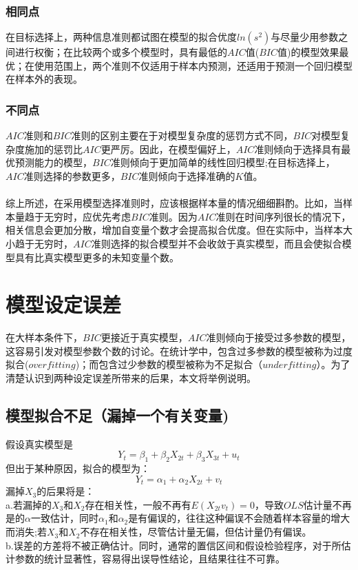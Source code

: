 \documentclass[12pt,a4paper]{article}
\begin{document}
\subsubsection{相同点}
 \indent
在目标选择上，两种信息准则都试图在模型的拟合优度$ln(s^2)$与尽量少用参数之间进行权衡；在比较两个或多个模型时，具有最低的$AIC$值($BIC$值)的模型效果最优；在使用范围上，两个准则不仅适用于样本内预测，还适用于预测一个回归模型在样本外的表现。
\subsubsection{不同点}
  \indent
  $AIC$准则和$BIC$准则的区别主要在于对模型复杂度的惩罚方式不同，$BIC$对模型复杂度施加的惩罚比$AIC$更严厉。因此，在模型偏好上，$AIC$准则倾向于选择具有最优预测能力的模型，$BIC$准则倾向于更加简单的线性回归模型;在目标选择上，$AIC$准则选择的参数更多，$BIC$准则倾向于选择准确的$K$值。\\
  \\
 \indent 
综上所述，在采用模型选择准则时，应该根据样本量的情况细细斟酌。比如，当样本量趋于无穷时，应优先考虑$BIC$准则。因为$AIC$准则在时间序列很长的情况下，相关信息会更加分散，增加自变量个数才会提高拟合优度。但在实际中，当样本大小趋于无穷时，$AIC$准则选择的拟合模型并不会收敛于真实模型，而且会使拟合模型具有比真实模型更多的未知变量个数。
 \section{模型设定误差}
 \indent 
 在大样本条件下，$BIC$更接近于真实模型，$AIC$准则倾向于接受过多参数的模型，这容易引发对模型参数个数的讨论。在统计学中，包含过多参数的模型被称为过度拟合($overfitting$)；而包含过少参数的模型被称为不足拟合（$underfitting$）。为了清楚认识到两种设定误差所带来的后果，本文将举例说明。
\subsection{模型拟合不足（漏掉一个有关变量)}
\noindent
假设真实模型是
$$Y_t=\beta_{1}+\beta_{2}X_{2t}+\beta_{3}X_{3t}+u_{t}$$
但出于某种原因，拟合的模型为：
$$Y_{t}=\alpha_{1}+\alpha_{2}X_{2t}+v_{t}$$
 漏掉$X_{3}$的后果将是：\\
 \indent 
a.若漏掉的$X_{3}$和$X_{2}$存在相关性，一般不再有$E(X_{2t}v_{t})=0$，导致$OLS$估计量不再是的$\alpha$一致估计，同时$\alpha_{1}$和$\alpha_{2}$是有偏误的，往往这种偏误不会随着样本容量的增大而消失;若$X_{3}$和$X_{2}$不存在相关性，尽管估计量无偏，但估计量仍有偏误。\\
\indent 
b.误差的方差将不被正确估计。同时，通常的置信区间和假设检验程序，对于所估计参数的统计显著性，容易得出误导性结论，且结果往往不可靠。
\end{document}
